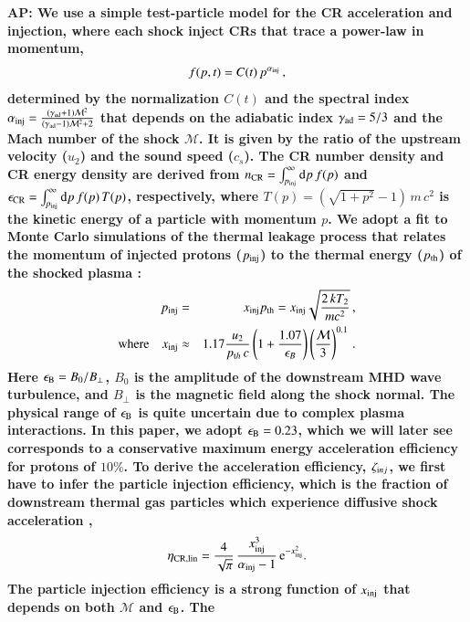 \documentclass[a4paper,fleqn,usenatbib]{mnras}
\newcommand{\dd}{\mathrm{d}}
\newcommand\eb{\epsilon_\rmn{B}}
\def\AP#1{{\bf  AP: #1}}
\begin{document}
\AP{We use a simple test-particle model for the CR acceleration and
  injection, where each shock inject CRs that trace a power-law in
  momentum,
  \begin{equation}
    f(p,t) = C(t)\,p^{\alpha_{\mathrm{inj}}}\,,
  \end{equation}
  determined by the normalization $C(t)$ and the spectral index
  $\alpha_{\mathrm{inj}}=\frac{(\gamma_{\mathrm{ad}}+1)\mathcal{M}^2}{(\gamma_{\mathrm{ad}}-1)\mathcal{M}^2+2}$
  that depends on the adiabatic index $\gamma_{\mathrm{ad}} = 5/3$ and the
  Mach number of the shock $\mathcal{M}$. It is given by the ratio of
  the upstream velocity ($u_2$) and the sound speed ($c_s$). The CR
  number density and CR energy density are derived from $n_\rmn{CR} =
  \int_{p_\rmn{inj}}^\infty \dd p\, f(p)$ and $\epsilon_\rmn{CR} =
  \int_{p_\rmn{inj}}^\infty \dd p\, f(p) \,T(p)$, respectively, where
  $T(p) = (\sqrt{1+p^2} -1)\, m\,c^2$ is the kinetic energy of a
  particle with momentum $p$. We adopt a fit to Monte Carlo
  simulations of the thermal leakage process that relates the momentum
  of injected protons ($p_{\mathrm{inj}}$) to the thermal energy
  ($p_{\mathrm{th}}$) of the shocked plasma \citep{kang11}:
  \begin{eqnarray}
  \label{eq:qinj}
  p_{\mathrm{inj}} &=& x_{\mathrm{inj}} p_{\mathrm{th}} = x_{\mathrm{inj}} \sqrt{\frac{2 \,k T_2}{m c^2}}\,, \nonumber \\
  {\mathrm{where}}\quad x_{\mathrm{inj}} &\approx& 1.17 \frac{u_2}{p_{{\mathrm{t}}h}\,c} \left(1+
  \frac{1.07}{\epsilon_B}\right) \left(\frac{\mathcal{M}}{3}\right)^{0.1}\,.
  \end{eqnarray}
Here $\eb = B_0/B_{\perp}$, $B_0$ is the amplitude of the downstream
MHD wave turbulence, and $B_{\perp}$ is the magnetic field along the
shock normal. The physical range of $\eb$ is quite uncertain due to
complex plasma interactions. In this paper, we adopt $\eb = 0.23$,
which we will later see corresponds to a conservative maximum energy
acceleration efficiency for protons of $10\%$. To derive the
acceleration efficiency, $\zeta_{{\mathrm{i}}nj}$, we first have to infer the
particle injection efficiency, which is the fraction of downstream
thermal gas particles which experience diffusive shock acceleration
\citep[for details see ][]{pinzke13},
\begin{equation}
  \label{eq:eta}
  \eta_{\mathrm{CR,lin}} =
  \frac{4}{\sqrt{\pi}}\,\frac{x_{\mathrm{inj}}^3}{\alpha_{\mathrm{inj}}-1}\,
  {\mathrm{e}}^{-x_{\mathrm{inj}}^2}.
\end{equation}
The particle injection efficiency is a strong function of
$x_{\mathrm{inj}}$ that depends on both $\mathcal{M}$ and $\eb$. The
}
\end{document}
